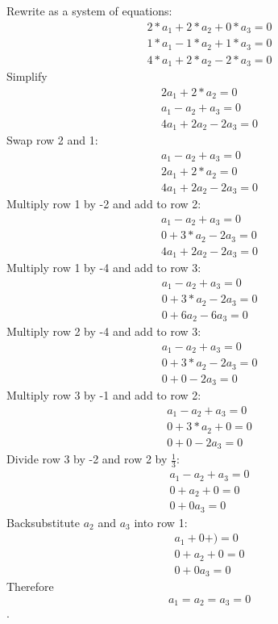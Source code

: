 \begin{Answer}[ref=vector_independence]
    Rewrite as a system of equations:
        $$\begin{matrix}
			2*a_1 +2*a_2 + 0*a_3 = 0 \\
			1*a_1 - 1*a_2 +1*a_3 = 0 \\
			4*a_1 + 2*a_2 - 2*a_3 = 0
		\end{matrix} $$
	Simplify
		$$\begin{matrix}
			2a_1 +2*a_2  = 0 \\
			a_1 - a_2 + a_3 = 0 \\
			4a_1 + 2a_2 - 2a_3 = 0
		\end{matrix} $$
	Swap row 2 and 1:
	$$\begin{matrix}
			a_1 - a_2 + a_3 = 0 \\
			2a_1 +2*a_2  = 0 \\
			4a_1 + 2a_2 - 2a_3 = 0
		\end{matrix} $$
	Multiply row 1 by -2 and add to row 2:
	$$\begin{matrix}
			a_1 - a_2 + a_3 = 0 \\
			0 +  3*a_2 -2a_3    = 0 \\
			4a_1 + 2a_2 - 2a_3 = 0
		\end{matrix} $$
	Multiply row 1 by -4 and add to row 3:	
	$$\begin{matrix}
			a_1 - a_2 + a_3 = 0 \\
			0 +   3*a_2 -2a_3    = 0 \\
			0   + 6a_2 - 6a_3 = 0
		\end{matrix} $$
	Multiply row 2 by -4 and add to row 3:
	$$\begin{matrix}
			a_1 - a_2 + a_3 = 0 \\
			0 +   3*a_2 -2a_3    = 0 \\
			0   + 0   - 2a_3 = 0
		\end{matrix} $$
	Multiply row 3 by -1 and add to row 2:
	$$\begin{matrix}
			a_1 - a_2 + a_3 = 0 \\
			0 +   3*a_2 +0    = 0 \\
			0   + 0   - 2a_3 = 0
		\end{matrix} $$
    Divide row 3 by -2 and row 2 by $\frac{1}{3}$:
    $$\begin{matrix}
			a_1 - a_2 + a_3 = 0 \\
			0 +   a_2 +0    = 0 \\
			0   + 0   a_3 = 0
		\end{matrix} $$
	Backsubstitute $a_2$ and $a_3$ into row 1:
	 $$\begin{matrix}
			a_1 +0 + ) = 0 \\
			0 +   a_2 +0   = 0 \\
			0   + 0   a_3 = 0
		\end{matrix} $$
	 Therefore $$a_1 = a_2 = a_3 = 0$$.
\end{Answer}
    
    
    